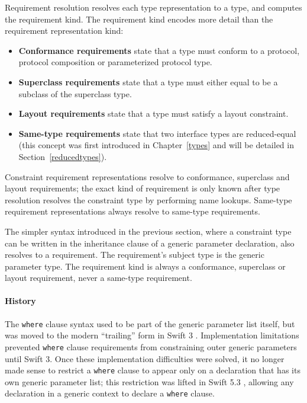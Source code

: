 \documentclass[a4paper,headsepline,bibliography=totoc,toc=flat,fleqn,twoside=semi]{scrbook}
\theoremstyle{definition}
\theoremstyle{definition}
\theoremstyle{definition}
\begin{document}
Requirement resolution resolves each type representation to a type, and computes the requirement kind. The requirement kind encodes more detail than the requirement representation kind:
\begin{itemize}
\item \textbf{Conformance requirements} state that a type must conform to a protocol, protocol composition or parameterized protocol type.
\item \textbf{Superclass requirements} state that a type must either equal to be a subclass of the superclass type.
\item \textbf{Layout requirements} state that a type must satisfy a layout constraint.
\item \textbf{Same-type requirements} state that two interface types are reduced-equal (this concept was first introduced in Chapter~\ref{types} and will be detailed in Section~\ref{reducedtypes}).
\end{itemize}
Constraint requirement representations resolve to conformance, superclass and layout requirements; the exact kind of requirement is only known after type resolution resolves the constraint type by performing name lookups. Same-type requirement representations always resolve to same-type requirements.

The simpler syntax introduced in the previous section, where a constraint type can be written in the inheritance clause of a generic parameter declaration, also resolves to a requirement. The requirement's subject type is the generic parameter type. The requirement kind is always a conformance, superclass or layout requirement, never a same-type requirement.

\paragraph{History}
The \texttt{where} clause syntax used to be part of the generic parameter list itself, but was moved to the modern ``trailing'' form in Swift 3 \cite{se0081}. Implementation limitations prevented \texttt{where} clause requirements from constraining outer generic parameters until Swift 3. Once these implementation difficulties were solved, it no longer made sense to restrict a \texttt{where} clause to appear only on a declaration that has its own generic parameter list; this restriction was lifted in Swift 5.3 \cite{se0261}, allowing any declaration in a generic context to declare a \texttt{where} clause.
\end{document}
